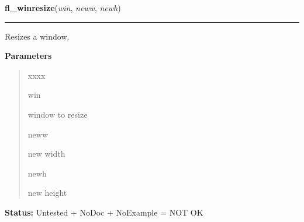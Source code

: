 \hspace{.8\funcindent}\begin{boxedminipage}{\funcwidth}

    \raggedright \textbf{fl\_winresize}(\textit{win}, \textit{neww}, \textit{newh})

    \vspace{-1.5ex}

    \rule{\textwidth}{0.5\fboxrule}
\setlength{\parskip}{2ex}
    Resizes a window.

\setlength{\parskip}{1ex}
      \textbf{Parameters}
      \vspace{-1ex}

      \begin{quote}
        \begin{Ventry}{xxxx}

          \item[win]

          window to resize

          \item[neww]

          new width

          \item[newh]

          new height

        \end{Ventry}

      \end{quote}

\textbf{Status:} Untested + NoDoc + NoExample = NOT OK



    \end{boxedminipage}

    \label{xformslib:library:fl_winmove}

    \vspace{0.5ex}


